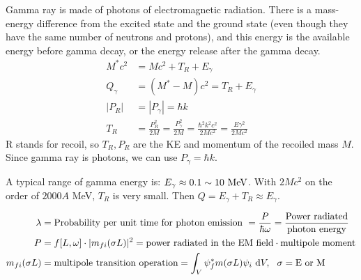 \documentclass{school-22.101-notes}
\date{November 23, 2011}
\begin{document}
\maketitle



Gamma ray is made of photons of electromagnetic radiation. There is a mass-energy difference from the excited state and the ground state (even though they have the same number of neutrons and protons), and this energy is the available energy before gamma decay, or the energy release after the gamma decay.
\begin{align}
M^* c^2 &= Mc^2 + T_R + E_{\gamma} \\
Q_{\gamma} &=  (M^* - M)c^2  = T_R + E_{\gamma} \\
|P_R| &= |P_{\gamma}| = \hbar k \\
T_R &= \frac{P_R^2}{2M} = \frac{P_{\gamma}^2}{2M} = \frac{\hbar^2 k^2 c^2}{2Mc^2} = \frac{E \gamma^2}{2Mc^2} 
\end{align}
 R stands for recoil, so $T_R, P_R$ are the KE and momentum of the recoiled mass $M$. Since gamma ray is photons, we can use $P_{\gamma} = \hbar k$. 
 
A typical range of gamma energy is: $E_{\gamma} \approx 0.1 \sim 10 \mbox{ } \mathrm{MeV}$. With $2Mc^2$ on the order of $2000 A$ MeV, $T_R$ is very small. Then $Q = E_{\gamma} + T_R \approx E_{\gamma}$.

\begin{align}
\lambda &= \mbox{Probability per unit time for photon emission } = \frac{P}{\hbar \omega} = \frac{\mbox{Power radiated}}{\mbox{photon energy}} \\
P&= f[L,\omega] \cdot |m_{fi} (\sigma L)|^2 = \mbox{power radiated in the EM field} \cdot \mbox{multipole moment} \\
m_{fi} (\sigma L) &= \mbox{multipole transition operation} = \int_V \psi_f^* m(\sigma L) \psi_i \mbox{ }\mathrm{d} V, \mbox{ } \mbox{ } \sigma = \mbox{E or M} 
\end{align}
\end{document}
